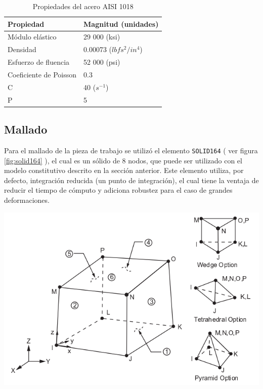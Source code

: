
\begin{table}[h]
\centering
\caption{Propiedades del acero AISI 1018}
\label{}
\begin{tabular}{p{4cm} p{4cm}} \hline
Propiedad & Magnitud (unidades) \\
\hline
Módulo elástico & 29 000 (ksi) \\
Densidad & 0.00073 ($lbf s^2/in^4$) \\
Esfuerzo de fluencia & 52 000 (psi) \\
Coeficiente de Poisson & 0.3 \\
C & 40 ($s^{-1}$) \\
P & 5 \\
\hline
\end{tabular}
\label{tab:material_properties}
\end{table}


\subsection{Mallado}

Para el mallado de la pieza de trabajo se utilizó el elemento \texttt{SOLID164} 
( ver figura \ref{fig:solid164} ), el cual es un sólido de 8 nodos, que puede ser utilizado con el modelo 
constitutivo descrito en la sección anterior. Este elemento utiliza, por defecto, integración reducida 
(un punto de integración), el cual tiene la ventaja de reducir el tiempo de cómputo y adiciona 
robustez para el caso de grandes deformaciones. ~\cite{lsdyna-ansys-manual}

\begin{center}
\includegraphics[scale=0.65]{src/ch3/solid164.png}
\label{fig:solid164}
\end{center}


